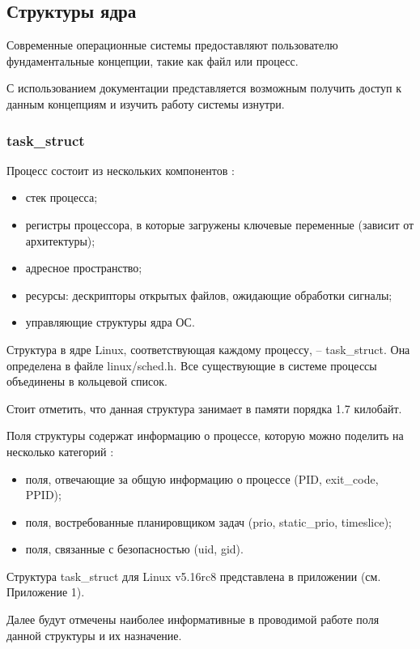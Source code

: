 \subsection{Структуры ядра}
Современные операционные системы предоставляют пользователю фундаментальные концепции, такие как файл или процесс. \cite{linuxTasks}

С использованием документации представляется возможным получить доступ к данным концепциям и изучить работу системы изнутри.

\subsubsection{task\_struct}
Процесс состоит из нескольких компонентов \cite{linuxTasks}:
\begin{itemize}[leftmargin=1.6\parindent]
\item стек процесса;
\item регистры процессора, в которые загружены ключевые переменные (зависит от архитектуры);
\item адресное пространство;
\item ресурсы: дескрипторы открытых файлов, ожидающие обработки сигналы;
\item управляющие структуры ядра ОС.
\end{itemize}

Структура в ядре Linux, соответствующая каждому процессу, -- task\_struct. Она определена в файле linux/sched.h. Все существующие в системе процессы объединены в кольцевой список. \cite{linuxTasks} 

Стоит отметить, что данная структура занимает в памяти порядка 1.7 килобайт.

Поля структуры содержат информацию о процессе, которую можно поделить на несколько категорий \cite{linuxTasks}:
\begin{itemize}[leftmargin=1.6\parindent]
\item поля, отвечающие за общую информацию о процессе (PID, exit\_code, PPID);
\item поля, востребованные планировщиком задач (prio, static\_prio, timeslice);
\item поля, связанные с безопасностью (uid, gid).
\end{itemize}

Структура task\_struct для Linux v5.16rc8 представлена в приложении (см. Приложение 1).

Далее будут отмечены наиболее информативные в проводимой работе поля данной структуры и их назначение.

